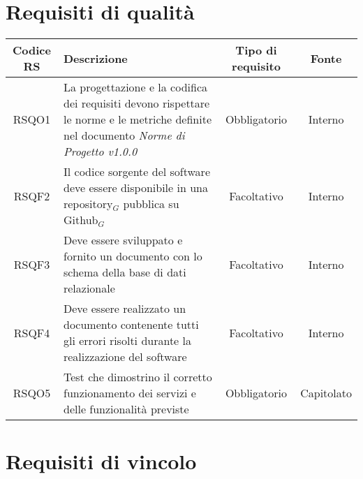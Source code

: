 {\section{Requisiti di qualità}
\begin{center}
	\renewcommand{\arraystretch}{1.4}
	\begin{tabularx}{\textwidth}{ |c|X|c|c| }
		\hline
		\rowcolor{Melon}
		\textbf{Codice RS} & \textbf{Descrizione} & \textbf{Tipo di requisito} & \textbf{Fonte} \\
		\hline
		RSQO1  & La progettazione e la codifica dei requisiti devono rispettare le norme e le metriche definite nel documento \textit{Norme di Progetto v1.0.0}& Obbligatorio & Interno \\
		\hline
	RSQF2  & Il codice sorgente del software deve essere disponibile in una repository$_G$ pubblica su Github$_G$  & Facoltativo & Interno \\
	\hline
	RSQF3  & Deve essere sviluppato e fornito un documento con lo schema della base di dati relazionale  & Facoltativo & Interno \\
	\hline
	RSQF4  & Deve essere realizzato un documento contenente tutti gli errori risolti durante la realizzazione del software & Facoltativo & Interno \\
		\hline
	RSQO5  & Test che dimostrino il corretto funzionamento dei servizi e delle funzionalità previste  & Obbligatorio & Capitolato \\
	\hline
	\end{tabularx}
\end{center}


\section{Requisiti di vincolo}

}
